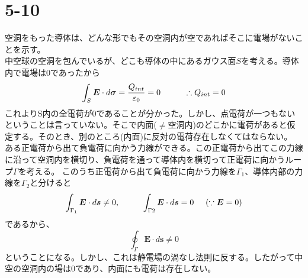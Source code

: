 \documentclass{jsarticle}
\begin{document}
\section*{5-10}
\noindent
空洞をもった導体は、どんな形でもその空洞内が空であればそこに電場がないことを示す。\\
中空球の空洞を包んでいるが、どこも導体の中にあるガウス面\(S\)を考える。導体内で電場は0であったから
\begin{equation}
\int_{S}\bm{E}\cdot d\bm{\sigma}=\frac{Q_{int}}{\varepsilon_{0}}=0\hspace{10mm}\therefore Q_{int}=0
\end{equation}
これよりS内の全電荷が0であることが分かった。しかし、点電荷が一つもないということは言っていない。そこで内面(\(\neq 空洞内\))のどこかに電荷があると仮定する。そのとき、別のところ(内面)に反対の電荷存在しなくてはならない。\\
ある正電荷から出て負電荷に向かう力線ができる。この正電荷から出てこの力線に沿って空洞内を横切り、負電荷を通って導体内を横切って正電荷に向かうループ\(\Gamma\)を考える。
このうち正電荷から出て負電荷に向かう力線を\(\Gamma_{1}\)、導体内部の力線を\(\Gamma_{2}\)と分けると
\[\int_{\Gamma_{1}}\bm{E}\cdot d\bm{s}\neq0,\hspace{10mm}\int_{\Gamma{2}}\bm{E}\cdot d\bm{s}=0\hspace{5mm}(\because\bm{E}=0)\]
であるから、
\[\oint_{\Gamma}\bm{E}\cdot d\bm{s}\neq0\]
ということになる。しかし、これは静電場の渦なし法則に反する。したがって中空の空洞内の場は0であり、内面にも電荷は存在しない。
























\newpage
\end{document}
